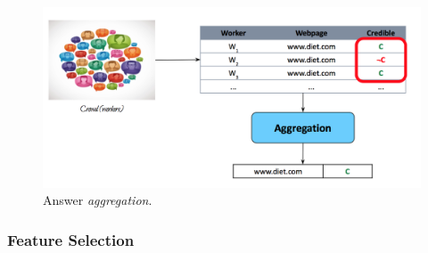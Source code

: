 \begin{figure}[H]%
 \centering
 \includegraphics[width=13cm]{./img/08/aggregation}
 \caption{\label{pic:aggregation} Answer \emph{aggregation}.}
\end{figure}


\subsubsection*{Feature Selection}

